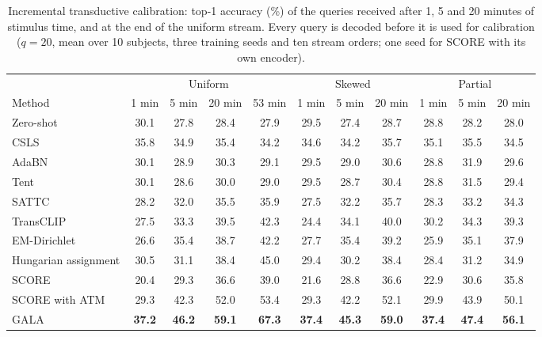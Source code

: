 \documentclass[10pt,twocolumn,letterpaper]{article}
\begin{document}
\begin{table}[t]
\caption{Incremental transductive calibration: top-1 accuracy (\%) of the queries received after 1, 5 and 20 minutes of stimulus time, and at the end of the uniform stream. Every query is decoded before it is used for calibration ($q=20$, mean over 10 subjects, three training seeds and ten stream orders; one seed for SCORE with its own encoder).}
\label{tab:inc}
\centering
\small
\setlength{\tabcolsep}{5pt}
\begin{tabular}{@{}lcccccccccc@{}}
\toprule
 & \multicolumn{4}{c}{Uniform} & \multicolumn{3}{c}{Skewed} & \multicolumn{3}{c}{Partial} \\
\cmidrule(lr){2-5}\cmidrule(lr){6-8}\cmidrule(lr){9-11}
Method & 1 min & 5 min & 20 min & 53 min & 1 min & 5 min & 20 min & 1 min & 5 min & 20 min \\
\midrule
Zero-shot & 30.1 & 27.8 & 28.4 & 27.9 & 29.5 & 27.4 & 28.7 & 28.8 & 28.2 & 28.0 \\
CSLS & 35.8 & 34.9 & 35.4 & 34.2 & 34.6 & 34.2 & 35.7 & 35.1 & 35.5 & 34.5 \\
AdaBN~\cite{li2018adabn} & 30.1 & 28.9 & 30.3 & 29.1 & 29.5 & 29.0 & 30.6 & 28.8 & 31.9 & 29.6 \\
Tent~\cite{wang2021tent} & 30.1 & 28.6 & 30.0 & 29.0 & 29.5 & 28.7 & 30.4 & 28.8 & 31.5 & 29.4 \\
SATTC~\cite{huang2026sattc} & 28.2 & 32.0 & 35.5 & 35.9 & 27.5 & 32.2 & 35.7 & 28.3 & 33.2 & 34.3 \\
TransCLIP~\cite{zanella2024transclip} & 27.5 & 33.3 & 39.5 & 42.3 & 24.4 & 34.1 & 40.0 & 30.2 & 34.3 & 39.3 \\
EM-Dirichlet~\cite{martin2024transductive} & 26.6 & 35.4 & 38.7 & 42.2 & 27.7 & 35.4 & 39.2 & 25.9 & 35.1 & 37.9 \\
Hungarian assignment & 30.5 & 31.1 & 38.4 & 45.0 & 29.4 & 30.2 & 38.4 & 28.4 & 31.2 & 34.9 \\
SCORE~\cite{cui2026score} & 20.4 & 29.3 & 36.6 & 39.0 & 21.6 & 28.8 & 36.6 & 22.9 & 30.6 & 35.8 \\
SCORE with ATM & 29.3 & 42.3 & 52.0 & 53.4 & 29.3 & 42.2 & 52.1 & 29.9 & 43.9 & 50.1 \\
\midrule
GALA & \textbf{37.2} & \textbf{46.2} & \textbf{59.1} & \textbf{67.3} & \textbf{37.4} & \textbf{45.3} & \textbf{59.0} & \textbf{37.4} & \textbf{47.4} & \textbf{56.1} \\
\bottomrule
\end{tabular}
\end{table}
\end{document}
